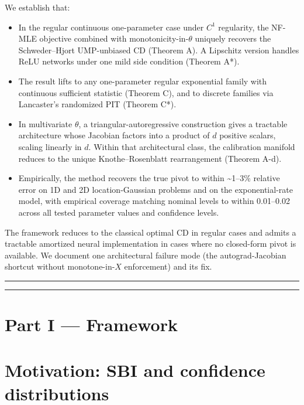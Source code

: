\documentclass[11pt]{article}
\providecommand{\tightlist}{\setlength{\itemsep}{0pt}\setlength{\parskip}{0pt}}
\begin{document}
We establish that:

\begin{itemize}
\tightlist
\item
  In the regular continuous one-parameter case under \(C^1\) regularity,
  the NF-MLE objective combined with monotonicity-in-\(\theta\) uniquely
  recovers the Schweder--Hjort UMP-unbiased CD (Theorem A). A Lipschitz
  version handles ReLU networks under one mild side condition (Theorem
  A*).
\item
  The result lifts to any one-parameter regular exponential family with
  continuous sufficient statistic (Theorem C), and to discrete families
  via Lancaster's randomized PIT (Theorem C*).
\item
  In multivariate \(\theta\), a triangular-autoregressive construction
  gives a tractable architecture whose Jacobian factors into a product
  of \(d\) positive scalars, scaling linearly in \(d\). Within that
  architectural class, the calibration manifold reduces to the unique
  Knothe--Rosenblatt rearrangement (Theorem A-d).
\item
  Empirically, the method recovers the true pivot to within
  \textasciitilde1--3\% relative error on 1D and 2D location-Gaussian
  problems and on the exponential-rate model, with empirical coverage
  matching nominal levels to within 0.01--0.02 across all tested
  parameter values and confidence levels.
\end{itemize}

The framework reduces to the classical optimal CD in regular cases and
admits a tractable amortized neural implementation in cases where no
closed-form pivot is available. We document one architectural failure
mode (the autograd-Jacobian shortcut without monotone-in-\(X\)
enforcement) and its fix.

\medskip\hrule\medskip

\tableofcontents

\medskip\hrule\medskip


\section*{Part I — Framework}

\section{Motivation: SBI and confidence distributions}\label{sec:1}
\end{document}
